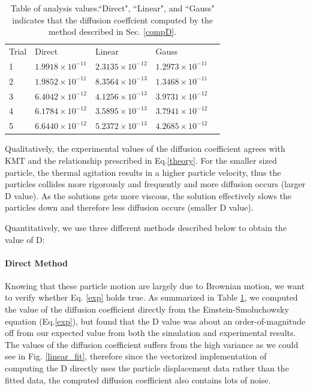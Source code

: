 \documentclass[iop,revtex4]{emulateapj_mod}
\begin{document}
\begin{table}[]
\centering
\caption{Table of analysis values.``Direct", ``Linear",  and ``Gauss" indicates that the diffusion coeffcient computed by the method described in Sec. \ref{compD}. }
\label{table_analysis}
\begin{tabular}{lllll}
Trial & Direct     & Linear& Gauss      \\
1     & $1.9918\times10^{-11}$ & $2.3135\times 10^{-12}$ & $1.2973\times 10^{-11}$ \\
2     & $1.9852\times10^{-11}$ & $8.3564\times 10^{-13}$ & $1.3468\times10^{-11}$ \\
3     & $6.4042\times10^{-12}$ & $4.1256\times 10^{-13}$ & $3.9731\times10^{-12}$ \\
4     & $6.1784\times10^{-12}$ & $3.5895\times 10^{-13}$ & $3.7941\times10^{-12}$ \\
5     & $6.6440\times10^{-12}$ & $5.2372\times 10^{-13}$ & $4.2685\times10^{-12}$
\end{tabular}
\end{table}
\par Qualitatively, the experimental values of the diffusion coefficient agrees with KMT and the relationship prescribed in Eq.\ref{theory}. For the smaller sized particle, the thermal agitation results in a higher particle velocity, thus the particles collides more rigorously and frequently and more diffusion occurs (larger D value). As the solutions gets more viscous, the solution effectively slows the particles down and therefore less diffusion occurs (smaller D value). 
\par Quantitatively, we use three different methods described below to obtain the value of D: 
\paragraph{Direct Method} 
Knowing that these particle motion are largely due to Brownian motion, we want to verify whether Eq. \ref{exp} holds true. As summarized in Table \ref{table_analysis}, we computed the value of the diffusion coefficient directly from the Einstein-Smoluchowsky equation (Eq.\ref{exp}), but found that the D value was about an order-of-magnitude off from our expected value from both the simulation and experimental results. The values of the diffusion coefficient suffers from the high variance as we could see in Fig. \ref{linear_fit}, therefore since the vectorized implementation of computing the D directly uses the particle displacement data rather than the fitted data, the computed diffusion coefficient also contains lots of noise. 
\end{document}
